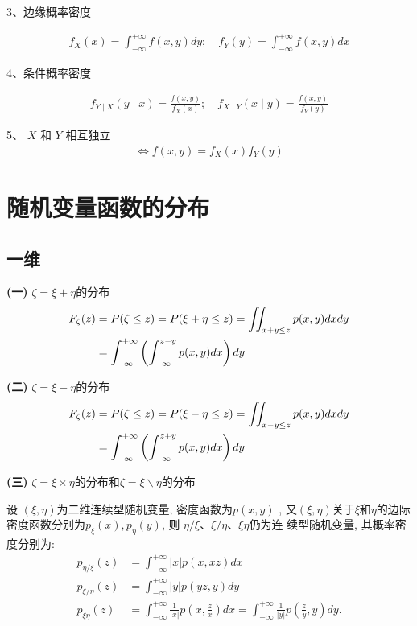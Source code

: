     3、边缘概率密度

    \begin{align}
        f_X(x)=\int_{-\infty}^{+\infty} f(x, y) d y ; \quad f_Y(y)=\int_{-\infty}^{+\infty} f(x, y) d x
    \end{align} 

    4、条件概率密度

    \begin{align}
        f_{Y \mid X}(y \mid x)=\frac{f(x, y)}{f_X(x)} ;\quad f_{X \mid Y}(x \mid y)=\frac{f(x, y)}{f_Y(y)}
    \end{align} 

    5、 $X$ 和 $Y$ 相互独立
    \begin{align}
        \displaystyle \Longleftrightarrow  f(x, y)=f_X(x) f_Y(y)
    \end{align}

\section{随机变量函数的分布}
\subsection{一维}

{\bf (一)} $\zeta = \xi + \eta$的分布
\begin{align}
F_{\zeta}(z) & = P(\zeta \leq z)  = P(\xi+\eta \leq z) = \iint_{x+y \leq z} p(x, y) d x d y\notag \\
				& = \int_{-\infty}^{+\infty}\left(\int_{-\infty}^{z-y} p(x, y) d x\right) d y
\end{align}

{\bf (二)} $\zeta = \xi - \eta$的分布
\begin{align}
F_{\zeta}(z) & = P(\zeta \leq z)  = P(\xi - \eta \leq z)= \iint_{x-y \leq z} p(x, y) d x d y\notag \\
				& = \int_{-\infty}^{+\infty}\left(\int_{-\infty}^{z+y} p(x, y) d x\right) d y
\end{align}

{\bf (三)} $\zeta = \xi \times \eta$的分布和$\zeta = \xi \backslash \eta$的分布

设 $(\xi, \eta)$为二维连续型随机变量, 密度函数为$p(x, y)$ , 又$(\xi, \eta)$关于$\xi$和$\eta$的边际密度函数分别为$p_{\xi}(x), p_{\eta}(y)$, 则 $\eta / \xi 、 \xi / \eta 、 \xi \eta$仍为连 续型随机变量, 其概率密度分别为:
\begin{align}
p_{\eta / \xi}(z) & = \int_{-\infty}^{+\infty}|x| p(x, x z) d x\\
p_{\xi / \eta}(z) & = \int_{-\infty}^{+\infty}|y| p(y z, y) d y\\
p_{\xi \eta}(z) & = \int_{-\infty}^{+\infty} \frac{1}{|x|} p\left(x, \frac{z}{x}\right) d x = \int_{-\infty}^{+\infty} \frac{1}{|y|} p\left(\frac{z}{y}, y\right) d y .
\end{align}


